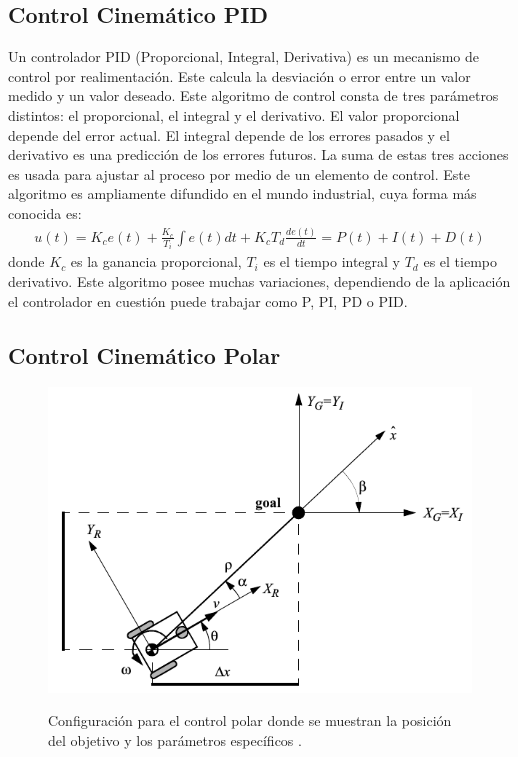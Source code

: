 \subsection{Control Cinem\'atico PID}

Un controlador PID (Proporcional, Integral, Derivativa) es un mecanismo de control por realimentaci\'on. Este calcula la desviaci\'on o error entre un valor medido y un valor deseado. Este algoritmo de control consta de tres par\'ametros distintos: el proporcional, el integral y el derivativo. El valor proporcional depende del error actual. El integral depende de los errores pasados y el derivativo es una predicci\'on de los errores futuros. La suma de estas tres acciones es usada para ajustar al proceso por medio de un elemento de control. Este algoritmo es ampliamente difundido en el mundo industrial, cuya forma m\'as conocida es:
\begin{align*}
u(t) = K_c e(t) + \frac{K_c}{T_i} \int e(t)dt + K_c T_d \frac{de(t)}{dt} = P(t) + I(t) + D(t)
\end{align*}
donde $K_c$ es la ganancia proporcional, $T_i$ es el tiempo integral y $T_d$ es el tiempo derivativo. Este algoritmo posee muchas variaciones, dependiendo de la aplicaci\'on el controlador en cuesti\'on puede trabajar como P, PI, PD o PID.

\subsection{Control Cinem\'atico Polar}

\begin{figure}%
\centering \footnotesize
 {\includegraphics[width=0.60\linewidth]{images/control_polar.png}}
 \captionsetup{font=footnotesize}
 \caption{Configuraci\'on para el control polar donde se muestran la posici\'on del objetivo y los par\'ametros espec\'ificos \cite{siegwart2011introduction}.}
\label{f:controlPolar}
\end{figure}

